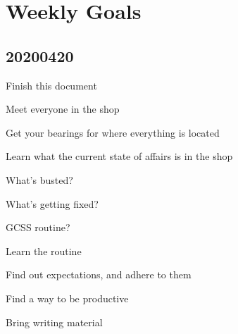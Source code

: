 \chapter{Weekly Goals}

\section{20200420}

\begin{todolist}
\item Finish this document
\item Meet everyone in the shop
\item Get your bearings for where everything is located
\item Learn what the current state of affairs is in the shop
  \begin{todolist}
  \item What's busted?
  \item What's getting fixed?
  \item GCSS routine?
  \end{todolist}
\item Learn the routine
\item Find out expectations, and adhere to them
\item Find a way to be productive
\item Bring writing material
\end{todolist}
